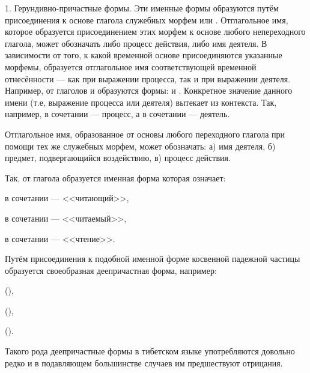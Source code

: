 1. Герундивно-причастные формы. Эти именные формы образуются путём присоединения к основе глагола служебных морфем  или . Отглагольное имя, которое образуется присоединением этих морфем к основе любого непереходного глагола, может обозначать либо процесс действия, либо имя деятеля. В зависимости от того, к какой временной основе присоединяются указанные морфемы, образуется отглагольное имя соответствующей временной отнесённости --- как при выражении процесса, так и при выражении деятеля. Например, от глаголов  и  образуются формы:  и . Конкретное значение данного имени (т.е, выражение процесса или деятеля) вытекает из контекста. Так, например, в сочетании   --- процесс, а в сочетании   --- деятель.

Отглагольное имя, образованное от основы любого переходного глагола при помощи тех же служебных морфем, может обозначать: а) имя деятеля, б) предмет, подвергающийся воздействию, в) процесс действия.

Так, от глагола  образуется именная форма  которая означает:
\begin{prfsample}
	\item в сочетании  --- <<читающий>>,
	\item в сочетании  --- <<читаемый>>,
	\item в сочетании  --- <<чтение>>.
\end{prfsample}

Путём присоединения к подобной именной форме косвенной падежной частицы  образуется своеобразная деепричастная форма, например:
\begin{prfsample}
	\item {} (),
	\item {} (),
	\item {} ().
\end{prfsample}
Такого рода деепричастные формы в тибетском языке употребляются довольно редко и в подавляющем большинстве случаев им предшествуют отрицания.

